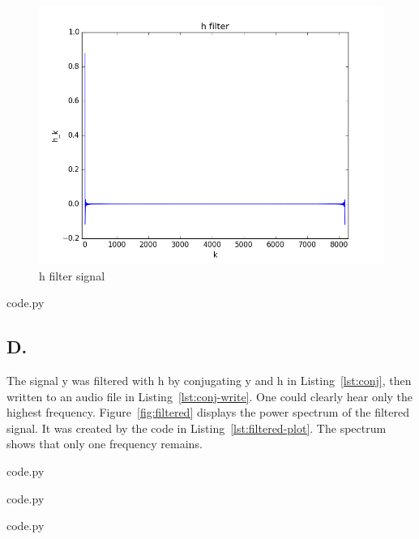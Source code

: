 \begin{figure}[H]
  \includegraphics[width=\textwidth]{1c_signal}
  \caption{h filter signal}
  \label{fig:1c-filter}
\end{figure}


  {code.py}

\subsection*{D.}

The signal y was filtered with h by conjugating y and h in Listing~\ref{lst:conj}, then written to an audio file in Listing~\ref{lst:conj-write}.
One could clearly hear only the highest frequency.
Figure~\ref{fig:filtered} displays the power spectrum of the filtered signal.
It was created by the code in Listing~\ref{lst:filtered-plot}.
The spectrum shows that only one frequency remains.


  {code.py}


  {code.py}


  {code.py}


